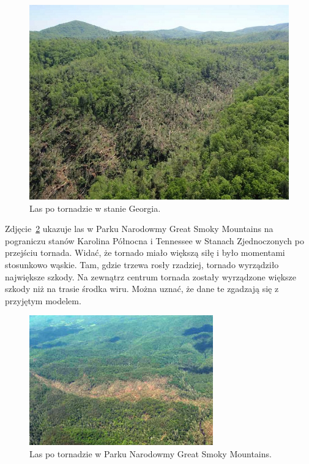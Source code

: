 \begin{figure}[!h]
	\center
	\includegraphics[scale=0.75]{walid1}
	\caption{Las po tornadzie w stanie Georgia.}
	\label{fig:walid1}
\end{figure} 

Zdjęcie~\ref{fig:walid2} ukazuje las w Parku Narodowmy Great Smoky Mountains na pograniczu stanów Karolina Północna i Tennessee w Stanach Zjednoczonych po przejściu tornada. Widać, że tornado miało większą siłę i było momentami stosunkowo wąskie. Tam, gdzie trzewa rosły rzadziej, tornado wyrządziło największe szkody. Na zewnątrz centrum tornada zostały wyrządzone większe szkody niż na trasie środka wiru. Można uznać, że dane te zgadzają się z przyjętym modelem.

\begin{figure}[!h]
	\center
	\includegraphics[scale=0.75]{walid2}
	\caption{Las po tornadzie w Parku Narodowmy Great Smoky Mountains.}
	\label{fig:walid2}
\end{figure} 